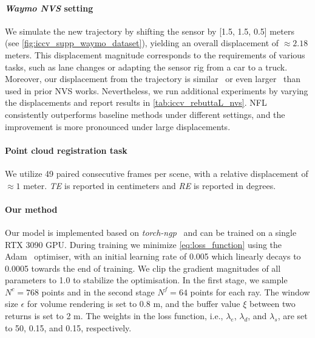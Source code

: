
\paragraph{\textit{Waymo NVS} setting} 
We simulate the new trajectory by shifting the sensor by [1.5, 1.5, 0.5] meters (see \cref{fig:iccv_supp_waymo_dataset}), yielding an overall displacement of ${\approx}2.18$ meters. This displacement magnitude corresponds to the requirements of various tasks, such as lane changes or adapting the sensor rig from a car to a truck. Moreover, our displacement from the trajectory is similar~\cite{Yang_2023_unisim} or even larger~\cite{Ost_2022_CVPR} than used in prior NVS works. Nevertheless, we run additional experiments by varying the displacements and report results in \cref{tab:iccv_rebuttaL_nvs}. NFL consistently outperforms baseline methods under different settings, and the improvement is more pronounced under large displacements.



\paragraph{Point cloud registration task}
We utilize 49 paired consecutive frames per scene, with a relative displacement of ${\approx}1$ meter. \textit{TE} is reported in centimeters and \textit{RE} is reported in degrees.

\paragraph{Our method}
Our model is implemented based on \emph{torch-ngp}~\cite{torch-ngp,mueller2022instant} and can be trained on a single RTX 3090 GPU. During training we minimize \cref{eq:loss_function} using the Adam~\cite{kingma2014adam} optimiser, with an initial learning rate of 0.005 which linearly decays to 0.0005 towards the end of training. We clip the gradient magnitudes of all parameters to 1.0 to stabilize the optimisation. In the first stage, we sample $N^c = 768$ points and in the second stage $N^f=64$ points for each ray. The window size $\epsilon$ for volume rendering is set to 0.8 m, and the buffer value $\xi$ between two returns is set to 2 m. The weights in the loss function, i.e., $\lambda_e$, $\lambda_d$, and $\lambda_s$, are set to 50, 0.15, and 0.15, respectively.



